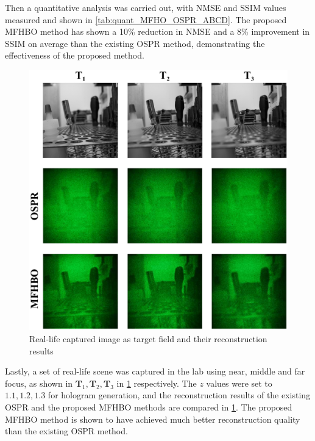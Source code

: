 	Then a quantitative analysis was carried out, with NMSE and SSIM values measured and shown in \cref{tab:quant_MFHO_OSPR_ABCD}. The proposed MFHBO method has shown a 10\% reduction in NMSE and a 8\% improvement in SSIM on average than the existing OSPR method, demonstrating the effectiveness of the proposed method.


	\begin{figure}[H]
		\centering
		\includegraphics[width=1.0\textwidth]{MFHO_OSPR_Pen_holder.pdf}
		\caption{Real-life captured image as target field and their reconstruction results}
		\label{fig:MFHO_OSPR_Pen_holder}
	\end{figure}

	Lastly, a set of real-life scene was captured in the lab using near, middle and far focus, as shown in $\textbf{T}_1, \textbf{T}_2, \textbf{T}_3$ in \cref{fig:MFHO_OSPR_Pen_holder} respectively. The $z$ values were set to $1.1, 1.2, 1.3$ for hologram generation, and the reconstruction results of the existing OSPR and the proposed MFHBO methods are compared in \cref{fig:MFHO_OSPR_Pen_holder}. The proposed MFHBO method is shown to have achieved much better reconstruction quality than the existing OSPR method.

